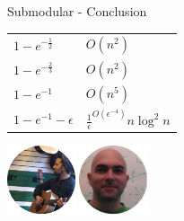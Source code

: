 \begin{frame}{Submodular - Conclusion}
    \begin{center}
        \Large
        \begin{tabular}{l l}
            \hline
            $1 - e^{-\frac{1}{2}}$ & $O(n^2)$
            \\
            \color{orange}$1 - e^{-\frac{2}{3}}$ & \color{orange}$O(n^2)$
            \\
            $1 - e^{-1}$ & $O(n^5)$
            \\
            $1 - e^{-1} - \epsilon$ & $\frac{1}{\epsilon}^{O(\epsilon^{-4})}n \log^2 n$
            \\
            \hline
        \end{tabular}
        
        \vfill
        
        \pause
        \includegraphics[height=2cm]{ariel.png}
        \includegraphics[height=2cm]{roy.png}
        
    \end{center}
\end{frame}